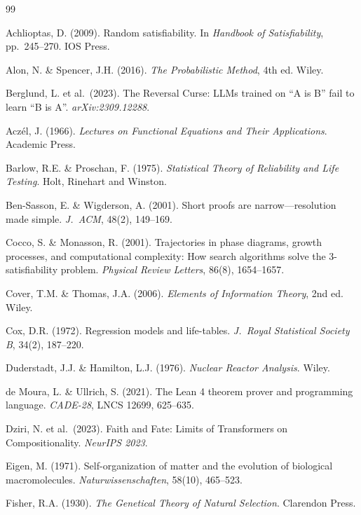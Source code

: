 \documentclass[11pt,a4paper]{article}
\begin{document}
\begin{thebibliography}{99}

Achlioptas, D. (2009).
Random satisfiability.
In \emph{Handbook of Satisfiability}, pp.~245--270. IOS Press.

Alon, N. \& Spencer, J.H. (2016).
\emph{The Probabilistic Method}, 4th ed.
Wiley.

Berglund, L. et al.\ (2023).
The Reversal Curse: LLMs trained on ``A is B'' fail to learn ``B is A''.
\emph{arXiv:2309.12288}.

Acz\'{e}l, J. (1966).
\emph{Lectures on Functional Equations and Their Applications}.
Academic Press.

Barlow, R.E. \& Proschan, F. (1975).
\emph{Statistical Theory of Reliability and Life Testing}.
Holt, Rinehart and Winston.

Ben-Sasson, E. \& Wigderson, A. (2001).
Short proofs are narrow---resolution made simple.
\emph{J.\ ACM}, 48(2), 149--169.

Cocco, S. \& Monasson, R. (2001).
Trajectories in phase diagrams, growth processes, and computational complexity: How search algorithms solve the 3-satisfiability problem.
\emph{Physical Review Letters}, 86(8), 1654--1657.

Cover, T.M. \& Thomas, J.A. (2006).
\emph{Elements of Information Theory}, 2nd ed.
Wiley.

Cox, D.R. (1972).
Regression models and life-tables.
\emph{J.\ Royal Statistical Society B}, 34(2), 187--220.

Duderstadt, J.J. \& Hamilton, L.J. (1976).
\emph{Nuclear Reactor Analysis}.
Wiley.

de Moura, L. \& Ullrich, S. (2021).
The Lean 4 theorem prover and programming language.
\emph{CADE-28}, LNCS 12699, 625--635.

Dziri, N. et al.\ (2023).
Faith and Fate: Limits of Transformers on Compositionality.
\emph{NeurIPS 2023}.

Eigen, M. (1971).
Self-organization of matter and the evolution of biological macromolecules.
\emph{Naturwissenschaften}, 58(10), 465--523.

Fisher, R.A. (1930).
\emph{The Genetical Theory of Natural Selection}.
Clarendon Press.


\end{thebibliography}
\end{document}

